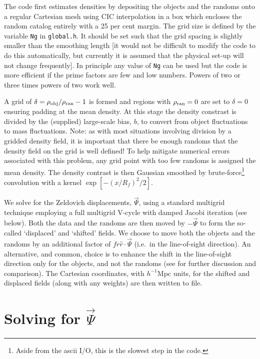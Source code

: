\documentclass[a4paper,11pt]{article}
\begin{document}
The code first estimates densities by depositing the objects and the randoms
onto a regular Cartesian mesh using CIC interpolation in a box which encloses
the random catalog entirely with a 25 per cent margin.
The grid size is defined by the variable {\tt Ng} in {\tt global.h}.  It
should be set such that the grid spacing is slightly smaller than the smoothing
length [it would not be difficult to modify the code to do this automatically,
but currently it is assumed that the physical set-up will not change
frequently].  In principle any value of {\tt Ng} can be used but the code is
more efficient if the prime factors are few and low numbers.  Powers of two or
three times powers of two work well.

A grid of $\delta=\rho_{\rm obj}/\rho_{\rm ran}-1$ is formed and regions
with $\rho_{\rm ran}=0$ are set to $\delta=0$ ensuring padding at the
mean density.
At this stage the density constrast is divided
by the (supplied) large-scale bias, $b$, to convert from object fluctuations
to mass fluctuations.
Note: as with most situations involving division by a gridded density field,
it is important that there be enough randoms that the density field on the
grid is well defined!  To help mitigate numerical errors associated with this
problem, any grid point with too few randoms is assigned the mean density.
The density contrast is then Gaussian smoothed by brute-force\footnote{Aside
{}from the ascii I/O, this is the slowest step in the code.} convolution with
a kernel $\exp[-(x/R_f)^2/2]$.

We solve for the Zeldovich \cite{Zel70} displacements, $\vec{\Psi}$, using
a standard multigrid technique employing a full multigrid V-cycle with
damped Jacobi iteration (see below).
Both the data and the randoms are then moved by $-\vec{\Psi}$ to form the
so-called `displaced' and `shifted' fields.
We choose to move both the objects and the randoms by an additional factor
of $f\hat{r}\hat{r}\cdot\vec{\Psi}$ (i.e.~in the line-of-sight direction).
An alternative, and common, choice is to enhance the shift in the line-of-sight
direction only for the objects, and not the randoms
(see \cite{ZelRecon} for further discussion and comparison).
The Cartesian coordinates, with $h^{-1}$Mpc units, for the shifted and
displaced fields (along with any weights) are then written to file.

\section{Solving for $\vec{\Psi}$}
\label{sec:equations}
\end{document}
